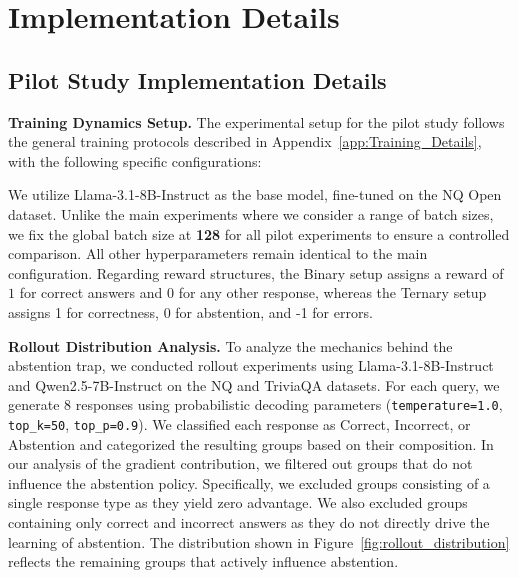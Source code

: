 \documentclass{article} %
\begin{document}
\section{Implementation Details}
\label{appendix:implementation}

\subsection{Pilot Study Implementation Details}
\label{app:pilot_details}

\noindent\textbf{Training Dynamics Setup.}
The experimental setup for the pilot study follows the general training protocols described in Appendix~\ref{app:Training_Details}, with the following specific configurations:

We utilize Llama-3.1-8B-Instruct as the base model, fine-tuned on the NQ Open dataset. Unlike the main experiments where we consider a range of batch sizes, we fix the global batch size at \textbf{128} for all pilot experiments to ensure a controlled comparison. All other hyperparameters remain identical to the main configuration.
Regarding reward structures, the Binary setup assigns a reward of $1$ for correct answers and $0$ for any other response, whereas the Ternary setup assigns 1 for correctness, 0 for abstention, and -1 for errors.

\noindent\textbf{Rollout Distribution Analysis.}
To analyze the mechanics behind the abstention trap, we conducted rollout experiments using Llama-3.1-8B-Instruct and Qwen2.5-7B-Instruct on the NQ and TriviaQA datasets.
For each query, we generate 8 responses using probabilistic decoding parameters (\texttt{temperature=1.0}, \texttt{top\_k=50}, \texttt{top\_p=0.9}). 
We classified each response as Correct, Incorrect, or Abstention and categorized the resulting groups based on their composition.
In our analysis of the gradient contribution, we filtered out groups that do not influence the abstention policy.
Specifically, we excluded groups consisting of a single response type as they yield zero advantage.
We also excluded groups containing only correct and incorrect answers as they do not directly drive the learning of abstention.
The distribution shown in Figure~\ref{fig:rollout_distribution} reflects the remaining groups that actively influence abstention.



\end{document}
